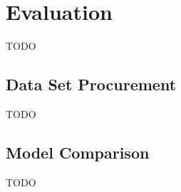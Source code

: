 \chapter{Evaluation}
\label{chap:Evaluation}

TODO

\section{Data Set Procurement}

TODO

\section{Model Comparison}

TODO